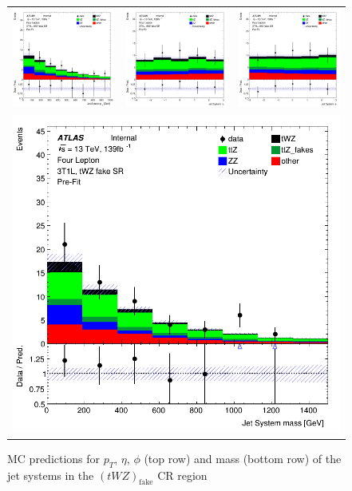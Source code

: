 \begin{figure}[htbp]
\centering
  \begin{tabular}{ccc}

    \includegraphics[width=.2\textwidth]{figures/PreFitPlots/lep4_tWZ_3T1L_Jet_sys_Pt}&
    \includegraphics[width=.2\textwidth]{figures/PreFitPlots/lep4_tWZ_3T1L_Jet_sys_Eta} &
    \includegraphics[width=.2\textwidth]{figures/PreFitPlots/lep4_tWZ_3T1L_Jet_sys_Phi} \\
    \multicolumn{3}{c}{\includegraphics[width=.2\textwidth]{figures/PreFitPlots/lep4_tWZ_3T1L_Jet_sys_mass}}

  \end{tabular}
  \caption{MC predictions for $p_{T}$, $\eta$, $\phi$ (top row) and mass (bottom row) of the jet systems in the $(tWZ)_{\text{fake}}$ CR region }
  \label{fig:4lep-3T1L-CR-jet-sys-Plots}
\end{figure}
\clearpage

